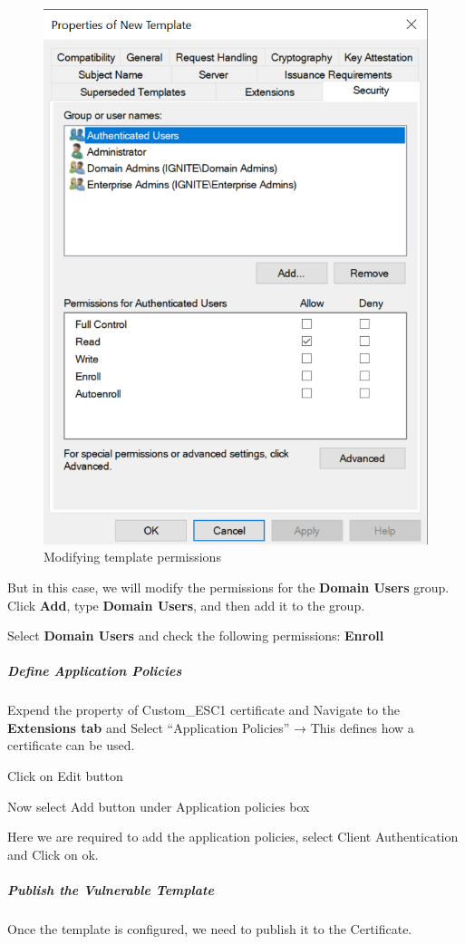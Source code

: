 \begin{figure}
    \centering
    \includegraphics[width=0.75\linewidth]{modtempperm.png}
    \caption{Modifying template permissions}
    \label{fig:placeholder}
\end{figure}


But in this case, we will modify the permissions for the \textbf{Domain Users} group. Click \textbf{Add}, type \textbf{Domain Users}, and then add it to the group.

Select \textbf{Domain Users} and check the following permissions: \textbf{Enroll}

\subparagraph{\textbf{Define Application Policies}}

Expend the property of Custom\_ESC1 certificate and Navigate to the \textbf{Extensions tab} and Select “Application Policies” → This defines how a certificate can be used. 

Click on Edit button

Now select Add button under Application policies box

Here we are required to add the application policies, select Client Authentication and Click on ok.

\subparagraph{\textbf{Publish the Vulnerable Template}}

Once the template is configured, we need to publish it to the Certificate.

